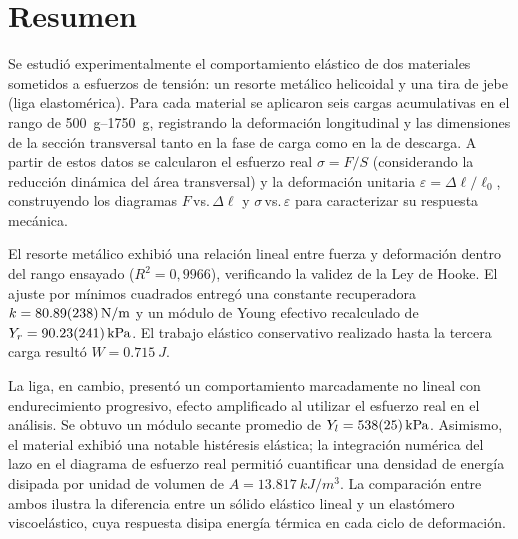 
\section{Resumen}

Se estudió experimentalmente el comportamiento elástico de dos materiales sometidos a esfuerzos de tensión: un resorte metálico helicoidal y una tira de jebe (liga elastomérica). Para cada material se aplicaron seis cargas acumulativas en el rango de \qtyrange{500}{1750}{g}, registrando la deformación longitudinal y las dimensiones de la sección transversal tanto en la fase de carga como en la de descarga. A partir de estos datos se calcularon el esfuerzo real $\sigma = F/S$ (considerando la reducción dinámica del área transversal) y la deformación unitaria $\varepsilon = \Delta\ell/\ell_0$, construyendo los diagramas $F$\,vs.\,$\Delta\ell$ y $\sigma$\,vs.\,$\varepsilon$ para caracterizar su respuesta mecánica.

El resorte metálico exhibió una relación lineal entre fuerza y deformación dentro del rango ensayado ($R^2 = 0{,}9966$), verificando la validez de la Ley de Hooke. El ajuste por mínimos cuadrados entregó una constante recuperadora $k = \qty{80,89 \pm 2,38}{N/m}$ y un módulo de Young efectivo recalculado de $Y_r = \qty{90,23 \pm 2,41}{kPa}$. El trabajo elástico conservativo realizado hasta la tercera carga resultó $W = \qty{0,715}{J}$. 

La liga, en cambio, presentó un comportamiento marcadamente no lineal con endurecimiento progresivo, efecto amplificado al utilizar el esfuerzo real en el análisis. Se obtuvo un módulo secante promedio de $Y_l = \qty{538 \pm 25}{kPa}$. Asimismo, el material exhibió una notable histéresis elástica; la integración numérica del lazo en el diagrama de esfuerzo real permitió cuantificar una densidad de energía disipada por unidad de volumen de $A = \qty{13,817}{kJ/m^3}$. La comparación entre ambos ilustra la diferencia entre un sólido elástico lineal y un elastómero viscoelástico, cuya respuesta disipa energía térmica en cada ciclo de deformación.